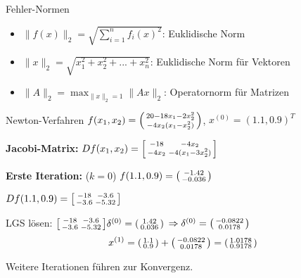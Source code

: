 \begin{corollary}{Fehler-Normen}
    \begin{itemize}
        \item $\|f(x)\|_2 = \sqrt{\sum_{i=1}^n f_i(x)^2}$: Euklidische Norm
        \item $\|x\|_2 = \sqrt{x_1^2 + x_2^2 + ... + x_n^2}$: Euklidische Norm für Vektoren
        \item $\|A\|_2 = \max_{\|x\|_2=1} \|Ax\|_2$: Operatornorm für Matrizen
    \end{itemize}
\end{corollary}

\begin{example2}{Newton-Verfahren} \small
$f(x_1, x_2) = \begin{psmallmatrix} 20 - 18x_1 - 2x_2^2 \\ -4x_2(x_1 - x_2^2) \end{psmallmatrix}$, $x^{(0)} = (1.1, 0.9)^T$

\textbf{Jacobi-Matrix:} 
$Df(x_1, x_2) = \begin{bsmallmatrix} -18 & -4x_2 \\ -4x_2 & -4(x_1 - 3x_2^2) \end{bsmallmatrix}$

\textbf{Erste Iteration:}  ($k = 0$)
$f(1.1, 0.9) = \begin{psmallmatrix} -1.42 \\ -0.036 \end{psmallmatrix}$

$Df(1.1, 0.9) = \begin{bsmallmatrix} -18 & -3.6 \\ -3.6 & -5.32 \end{bsmallmatrix}$

LGS lösen: $\begin{bsmallmatrix} -18 & -3.6 \\ -3.6 & -5.32 \end{bsmallmatrix} \delta^{(0)} = \begin{psmallmatrix} 1.42 \\ 0.036 \end{psmallmatrix}$
$\Rightarrow \delta^{(0)} = \begin{psmallmatrix} -0.0822 \\ 0.0178 \end{psmallmatrix}$
$$x^{(1)} = \begin{psmallmatrix} 1.1 \\ 0.9 \end{psmallmatrix} + \begin{psmallmatrix} -0.0822 \\ 0.0178 \end{psmallmatrix} = \begin{psmallmatrix} 1.0178 \\ 0.9178 \end{psmallmatrix}$$

Weitere Iterationen führen zur Konvergenz.
\end{example2}

